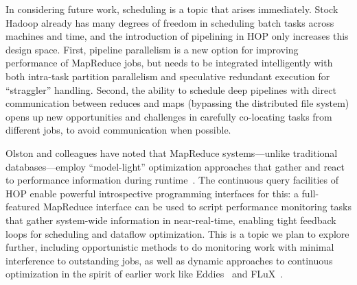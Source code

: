 In considering future work, scheduling is a topic that arises immediately.
Stock Hadoop already has many degrees of freedom in scheduling batch tasks across machines and time, and the introduction of pipelining in HOP only increases this design space.  First, pipeline parallelism is a new option for improving performance of MapReduce jobs, but needs to be integrated intelligently with both intra-task partition parallelism and speculative redundant execution for ``straggler'' handling.
Second, the ability to schedule deep pipelines with direct
communication between reduces and maps (bypassing the distributed file
system) opens up new opportunities and challenges in carefully co-locating tasks from different jobs, to avoid communication when possible.  

Olston and colleagues have noted that MapReduce systems---unlike traditional databases---employ ``model-light'' optimization approaches that gather and react to performance information during runtime~\cite{olston-usenix08}.  The continuous query facilities of HOP enable powerful introspective programming interfaces for this: a full-featured MapReduce interface can be used to script performance monitoring tasks that gather system-wide information in near-real-time, enabling tight feedback loops for scheduling and dataflow optimization.  This is a topic we plan to explore further, including opportunistic methods to do monitoring work with minimal interference to outstanding jobs, as well as dynamic approaches to continuous optimization in the spirit of earlier work like Eddies~\cite{eddies} and FLuX~\cite{flux-lb}.

